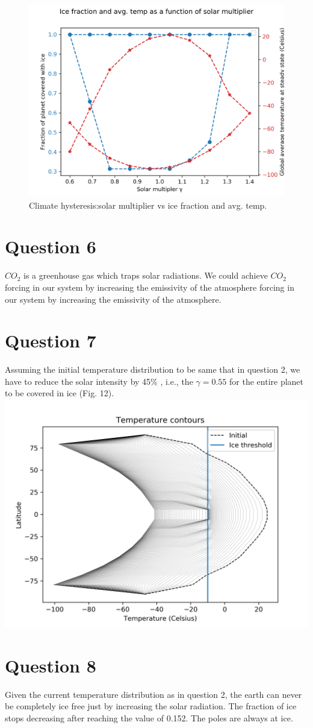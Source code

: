 \documentclass{article}
\begin{document}
\begin{figure}
\includegraphics[scale=0.8]{ratios_5.png} 
\caption{Climate hysteresis:solar multiplier vs ice fraction and avg. temp.}
\end{figure}

\section*{Question 6}
$CO_2$ is a greenhouse gas which traps solar radiations. We could achieve $CO_2$ forcing in our system by increasing the emissivity of the atmosphere forcing in our system by increasing the emissivity of the atmosphere.

\section*{Question 7}
Assuming the initial temperature distribution to be same that in question 2, we have to reduce the solar intensity by 45\% , i.e., the $\gamma = 0.55$ for the entire planet to be covered in ice (Fig. 12). 
\includegraphics[scale=0.6]{tcont_70.png} 

\section*{Question 8}
Given the current temperature distribution as in question 2, the earth can never be completely ice free just by increasing the solar radiation. The fraction of ice stops decreasing after reaching the value of 0.152. The poles are always at ice.
\end{document}
